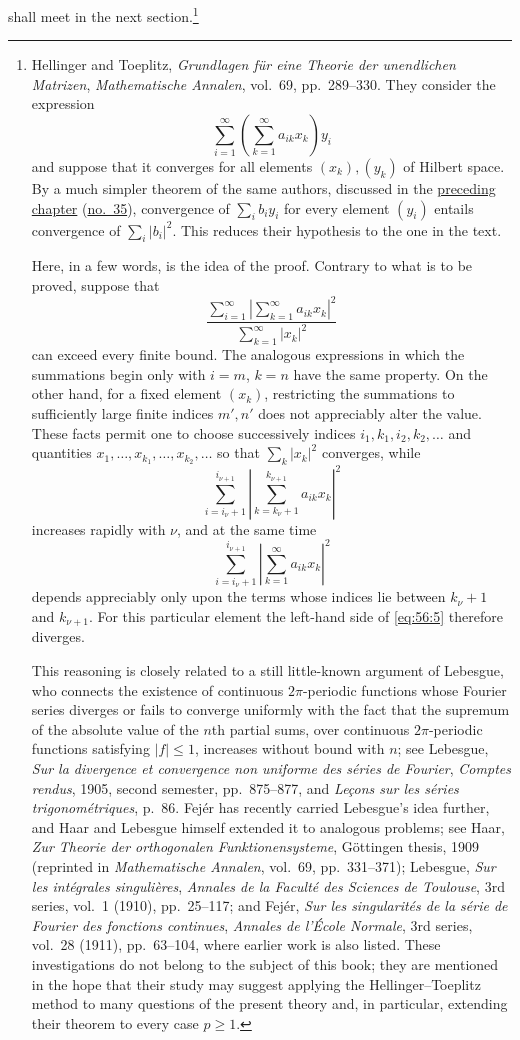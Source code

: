 \documentclass[
  paper=b5,
  fontsize=13pt,
  twoside=true,
  open=any,
  bookmarkpackage=false,
  chapterprefix=true,
  headings=normal
]{scrbook}
\theoremstyle{definition}
\begin{document}
shall meet in the next section.\footnote{Hellinger and Toeplitz,
\emph{Grundlagen f\"ur eine Theorie der unendlichen Matrizen},
\emph{Mathematische Annalen}, vol.~69, pp.~289--330. They consider the
expression
\[
  \sum_{i=1}^{\infty}\left(\sum_{k=1}^{\infty}a_{ik}x_k\right)y_i
\]
and suppose that it converges for all elements $(x_k),(y_k)$ of Hilbert
space. By a much simpler theorem of the same authors, discussed in the
\hyperref[chap:3]{preceding chapter} (\hyperref[sec:35]{no.~35}), convergence of $\sum_i b_i y_i$ for every
element $(y_i)$ entails convergence of $\sum_i|b_i|^2$. This reduces their
hypothesis to the one in the text.

Here, in a few words, is the idea of the proof. Contrary to what is to be
proved, suppose that
\[
 \frac{\displaystyle\sum_{i=1}^{\infty}
       \left|\sum_{k=1}^{\infty}a_{ik}x_k\right|^2}
      {\displaystyle\sum_{k=1}^{\infty}|x_k|^2}
\]
can exceed every finite bound. The analogous expressions in which the
summations begin only with $i=m$, $k=n$ have the same property. On the
other hand, for a fixed element $(x_k)$, restricting the summations to
sufficiently large finite indices $m',n'$ does not appreciably alter the
value. These facts permit one to choose successively indices
$i_1,k_1,i_2,k_2,\ldots$ and quantities
$x_1,\ldots,x_{k_1},\ldots,x_{k_2},\ldots$ so that
$\sum_k|x_k|^2$ converges, while
\[
 \sum_{i=i_\nu+1}^{i_{\nu+1}}
   \left|\sum_{k=k_\nu+1}^{k_{\nu+1}}a_{ik}x_k\right|^2
\]
increases rapidly with $\nu$, and at the same time
\[
 \sum_{i=i_\nu+1}^{i_{\nu+1}}
   \left|\sum_{k=1}^{\infty}a_{ik}x_k\right|^2
\]
depends appreciably only upon the terms whose indices lie between
$k_\nu+1$ and $k_{\nu+1}$. For this particular element the left-hand side
of \eqref{eq:56:5} therefore diverges.

This reasoning is closely related to a still little-known argument of
Lebesgue, who connects the existence of continuous $2\pi$-periodic
functions whose Fourier series diverges or fails to converge uniformly
with the fact that the supremum of the absolute value of the $n$th partial
sums, over continuous $2\pi$-periodic functions satisfying $|f|\leq1$,
increases without bound with $n$; see Lebesgue, \emph{Sur la divergence et
convergence non uniforme des s\'eries de Fourier}, \emph{Comptes rendus},
1905, second semester, pp.~875--877, and \emph{Le\c{c}ons sur les s\'eries
trigonom\'etriques}, p.~86. Fej\'er has recently carried Lebesgue's idea
further, and Haar and Lebesgue himself extended it to analogous problems;
see Haar, \emph{Zur Theorie der orthogonalen Funktionensysteme}, G\"ottingen
thesis, 1909 (reprinted in \emph{Mathematische Annalen}, vol.~69,
pp.~331--371); Lebesgue, \emph{Sur les int\'egrales singuli\`eres},
\emph{Annales de la Facult\'e des Sciences de Toulouse}, 3rd series,
vol.~1 (1910), pp.~25--117; and Fej\'er, \emph{Sur les singularit\'es de la
s\'erie de Fourier des fonctions continues}, \emph{Annales de l'\'Ecole
Normale}, 3rd series, vol.~28 (1911), pp.~63--104, where earlier work is
also listed. These investigations do not belong to the subject of this
book; they are mentioned in the hope that their study may suggest applying
the Hellinger--Toeplitz method to many questions of the present theory and,
in particular, extending their theorem to every case $p\geq1$.}
\end{document}
